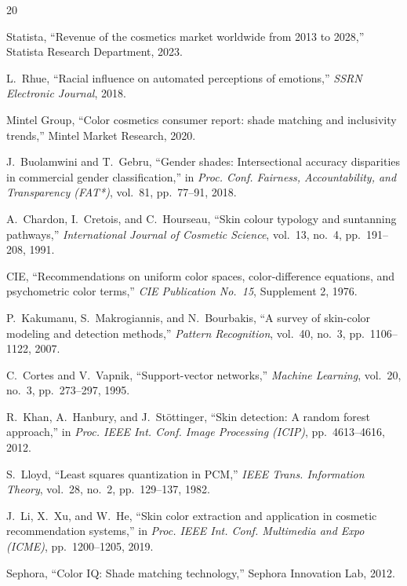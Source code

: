 \documentclass[conference]{IEEEtran}
\begin{document}
\begin{thebibliography}{20}

Statista, ``Revenue of the cosmetics market worldwide from 2013 to 2028,'' Statista Research Department, 2023.

L.~Rhue, ``Racial influence on automated perceptions of emotions,'' \textit{SSRN Electronic Journal}, 2018.

Mintel Group, ``Color cosmetics consumer report: shade matching and inclusivity trends,'' Mintel Market Research, 2020.

J.~Buolamwini and T.~Gebru, ``Gender shades: Intersectional accuracy disparities in commercial gender classification,'' in \textit{Proc. Conf. Fairness, Accountability, and Transparency (FAT*)}, vol.~81, pp.~77--91, 2018.

A.~Chardon, I.~Cretois, and C.~Hourseau, ``Skin colour typology and suntanning pathways,'' \textit{International Journal of Cosmetic Science}, vol.~13, no.~4, pp.~191--208, 1991.

CIE, ``Recommendations on uniform color spaces, color-difference equations, and psychometric color terms,'' \textit{CIE Publication No.~15}, Supplement 2, 1976.

P.~Kakumanu, S.~Makrogiannis, and N.~Bourbakis, ``A survey of skin-color modeling and detection methods,'' \textit{Pattern Recognition}, vol.~40, no.~3, pp.~1106--1122, 2007.

C.~Cortes and V.~Vapnik, ``Support-vector networks,'' \textit{Machine Learning}, vol.~20, no.~3, pp.~273--297, 1995.

R.~Khan, A.~Hanbury, and J.~St\"ottinger, ``Skin detection: A random forest approach,'' in \textit{Proc. IEEE Int. Conf. Image Processing (ICIP)}, pp.~4613--4616, 2012.

S.~Lloyd, ``Least squares quantization in PCM,'' \textit{IEEE Trans. Information Theory}, vol.~28, no.~2, pp.~129--137, 1982.

J.~Li, X.~Xu, and W.~He, ``Skin color extraction and application in cosmetic recommendation systems,'' in \textit{Proc. IEEE Int. Conf. Multimedia and Expo (ICME)}, pp.~1200--1205, 2019.

Sephora, ``Color IQ: Shade matching technology,'' Sephora Innovation Lab, 2012.


\end{thebibliography}
\end{document}
